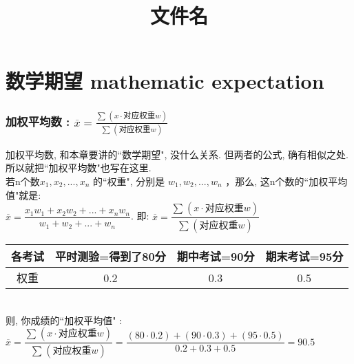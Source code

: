 \documentclass[UTF8]{ctexart}
\title{文件名}
\begin{document}
	\tableofcontents %
	\date{} %
	\maketitle  %
	
	
	
	
	\part{数学期望 mathematic expectation}
	
	
	
	
	\section{加权平均数 : $		\overline{x}=\frac{\sum_{}^{}{\left( x\cdot \text{对应权重}w \right)}}{\sum_{}^{}{\left( \text{对应权重}w \right)}}		$}
	
	加权平均数, 和本章要讲的``数学期望", 没什么关系. 但两者的公式, 确有相似之处. 所以就把``加权平均数"也写在这里.\\
	
	若n个数$ x_1, x_2, ..., x_n$ 的``权重", 分别是 $ w_1, w_2, ..., w_n$ ，那么, 这n个数的``加权平均值"就是: \\
	$	\overline{x}=\dfrac{x_1w_1+x_2w_2+...+x_nw_n}{w_1+w_2+...+w_n}	$. 
	即: $		\overline{x}=\dfrac{\sum_{}^{}{\left( x\cdot \text{对应权重}w \right)}}{\sum_{}^{}{\left( \text{对应权重}w \right)}}		$ \\
	
	
	\begin{myEnvSample}
\begin{tabular}{|c|c|c|c|}
	\hline
	各考试 & 平时测验=得到了80分 & 期中考试=90分 & 期末考试=95分 \\
	\hline
	权重 & 0.2 & 0.3 & 0.5 \\
	\hline
\end{tabular} \\

则, 你成绩的``加权平均值" : \\
 $\overline{x}=\dfrac{\sum_{}^{}{\left( x\cdot \text{对应权重}w \right)}}{\sum_{}^{}{\left( \text{对应权重}w \right)}}=\dfrac{\left( 80\cdot 0.2 \right) +\left( 90\cdot 0.3 \right) +\left( 95\cdot 0.5 \right)}{0.2+0.3+0.5}=90.5$ 
	\end{myEnvSample}
	\vspace{1em} 
	
	
	
\end{document}

